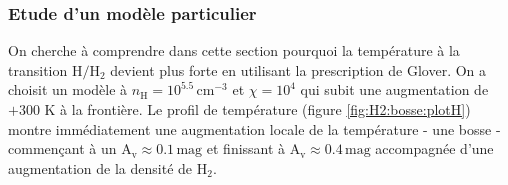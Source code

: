  

\subsubsection{Etude d'un modèle particulier}

On cherche à comprendre dans cette section pourquoi la température à la transition $\mathrm{H}/\mathrm{H}_2$ devient plus forte en utilisant la prescription de Glover. On a choisit un modèle à $n_\mathrm{H} = 10^{5.5} \,\mathrm{cm}^{-3}$ et $\chi = 10^4$ qui subit une augmentation de $+300$ K à la frontière. Le profil de température (figure \ref{fig:H2:bosse:plotH}) montre immédiatement une augmentation locale de la température - une bosse - commençant à un $\mathrm{A}_\mathrm{v} \approx 0.1 \,\mathrm{mag}$ et finissant à $\mathrm{A}_\mathrm{v} \approx 0.4 \,\mathrm{mag}$ accompagnée d'une augmentation de la densité de $\mathrm{H}_2$. \newline 

